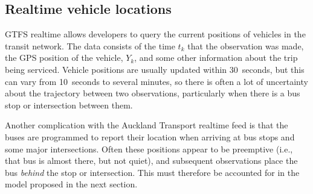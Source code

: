 


\subsection{Realtime vehicle locations}
\label{sec:realtime_data}

GTFS realtime allows developers to query the current positions of vehicles
in the transit network.
The data consists of the time $t_k$ that the observation was made,
the GPS position of the vehicle, $Y_k$, 
and some other information about the trip being serviced.
Vehicle positions are usually updated within 30~seconds,
but this can vary from 10~seconds to several minutes,
so there is often a lot of uncertainty about the trajectory
between two observations, particularly when there is a bus stop
or intersection between them.

Another complication with the Auckland Transport realtime feed is that
the buses are programmed to report their location when arriving at
bus stops and some major intersections.
Often these positions appear to be preemptive (i.e., that bus is almost there, 
but not quiet),
and subsequent observations place the bus \emph{behind} the stop or intersection.
This must therefore be accounted for in the model proposed in the next section.
